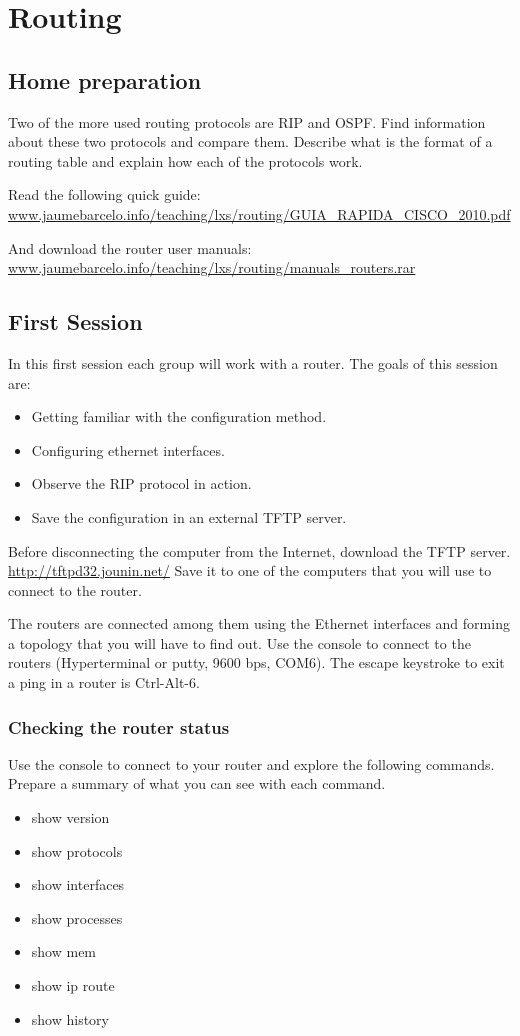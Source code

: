 \chapter{Routing}

\section{Home preparation}

Two of the more used routing protocols are RIP and OSPF.
Find information about these two protocols and compare them.
Describe what is the format of a routing table and explain how each of the protocols work.

Read the following quick guide:
\url{www.jaumebarcelo.info/teaching/lxs/routing/GUIA_RAPIDA_CISCO_2010.pdf}

And download the router user manuals:
\url{www.jaumebarcelo.info/teaching/lxs/routing/manuals_routers.rar}

\section{First Session}

In this first session each group will work with a router.
The goals of this session are:
\begin{itemize}
\item Getting familiar with the configuration method.
\item Configuring ethernet interfaces.
\item Observe the RIP protocol in action.
\item Save the configuration in an external TFTP server.
\end{itemize}

Before disconnecting the computer from the Internet, download the TFTP server.
\url{http://tftpd32.jounin.net/}
Save it to one of the computers that you will use to connect to the router.

The routers are connected among them using the Ethernet interfaces and forming a topology that you will have to find out.
Use the console to connect to the routers (Hyperterminal or putty, 9600 bps, COM6).
The escape keystroke to exit a ping in a router is Ctrl-Alt-6.

\subsection{Checking the router status}

Use the console to connect to your router and explore the following commands.
Prepare a summary of what you can see with each command.
\begin{itemize}
\item show version
\item show protocols
\item show interfaces
\item show processes
\item show mem
\item show ip route
\item show history
\end{itemize}

